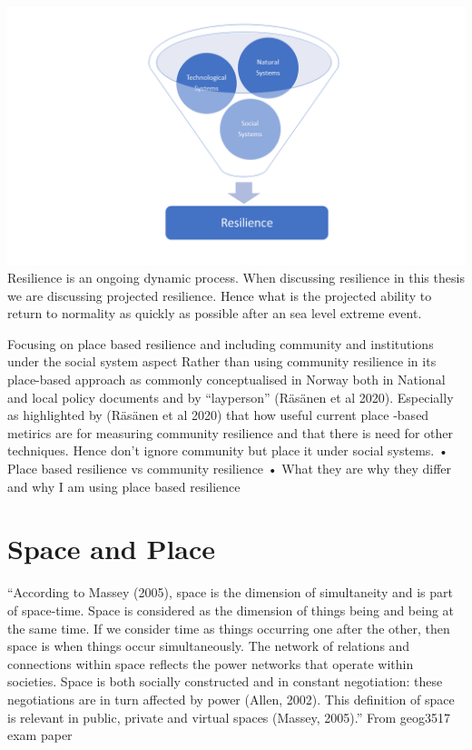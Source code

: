 \documentclass{article}
\begin{document}
\includegraphics[scale=1.1]{fig_theory/resilience model .png}
\mbox{}\\[6pc]

Resilience is an ongoing dynamic process. When discussing resilience in this thesis we are discussing projected resilience. Hence what is the projected ability to return to normality as quickly as possible after an sea level extreme event. 
 
Focusing on place based resilience and including community and institutions under the social system aspect
Rather than using community resilience in its place-based approach as commonly conceptualised in Norway both in National and local policy documents and by “layperson” (Räsänen et al 2020). Especially as highlighted by (Räsänen et al 2020) that how useful current place -based metirics are for measuring community resilience and that there is need for other techniques. Hence don’t ignore community but place it under social systems. 
•	Place based resilience vs community resilience
•	What they are why they differ and why I am using place based resilience

\section{Space and Place} 
“According to Massey (2005), space is the dimension of simultaneity and is part of space-time.
Space is considered as the dimension of things being and being at the same time. If we
consider time as things occurring one after the other, then space is when things occur
simultaneously. The network of relations and connections within space reflects the power
networks that operate within societies. Space is both socially constructed and in constant
negotiation: these negotiations are in turn affected by power (Allen, 2002). This definition of
space is relevant in public, private and virtual spaces (Massey, 2005).” From geog3517 exam paper
\end{document}
